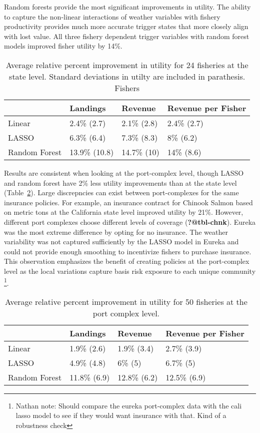 \documentclass[
  letterpaper,
  DIV=11,
  numbers=noendperiod]{scrartcl}
\begin{document}
Random forests provide the most significant improvements in utility. The
ability to capture the non-linear interactions of weather variables with
fishery productivity provides much more accurate trigger states that
more closely align with lost value. All three fishery dependent trigger
variables with random forest models improved fisher utility by 14\%.

\hypertarget{tbl-utility-state}{}
\begin{table}
\caption{\label{tbl-utility-state}Average relative percent improvement in utility for 24 fisheries at the
state level. Standard deviations in utilty are included in parathesis.
Fishers }\tabularnewline

\centering
\begin{tabular}{llll}
\toprule
 & Landings & Revenue & Revenue per Fisher\\
\midrule
Linear & 2.4\%
(2.7) & 2.1\%
(2.8) & 2.4\%
(2.7)\\
LASSO & 6.3\%
(6.4) & 7.3\%
(8.3) & 8\%
(6.2)\\
Random Forest & 13.9\%
(10.8) & 14.7\%
(10) & 14\%
(8.6)\\
\bottomrule
\end{tabular}
\end{table}

Results are consistent when looking at the port-complex level, though
LASSO and random forest have 2\% less utility improvements than at the
state level (Table~\ref{tbl-utility-port}). Large discrepncies can exist
between port-complexes for the same insurance policies. For example, an
insurance contract for Chinook Salmon based on metric tons at the
California state level improved utility by 21\%. However, different port
complexes choose different levels of coverage (\textbf{?@tbl-chnk}).
Eureka was the most extreme difference by opting for no insurance. The
weather variability was not captured sufficiently by the LASSO model in
Eureka and could not provide enough smoothing to incentivize fishers to
purchase insurance. This observation emphasizes the benefit of creating
policies at the port-complex level as the local variations capture basis
risk exposure to each unique community \footnote{Nathan note: Should
  compare the eureka port-complex data with the cali lasso model to see
  if they would want insurance with that. Kind of a robustness check}.

\hypertarget{tbl-utility-port}{}
\begin{table}
\caption{\label{tbl-utility-port}Average relative percent improvement in utility for 50 fisheries at the
port complex level. }\tabularnewline

\centering
\begin{tabular}{llll}
\toprule
 & Landings & Revenue & Revenue per Fisher\\
\midrule
Linear & 1.9\%
(2.6) & 1.9\%
(3.4) & 2.7\%
(3.9)\\
LASSO & 4.9\%
(4.8) & 6\%
(5) & 6.7\%
(5)\\
Random Forest & 11.8\%
(6.9) & 12.8\%
(6.2) & 12.5\%
(6.9)\\
\bottomrule
\end{tabular}
\end{table}
\end{document}
